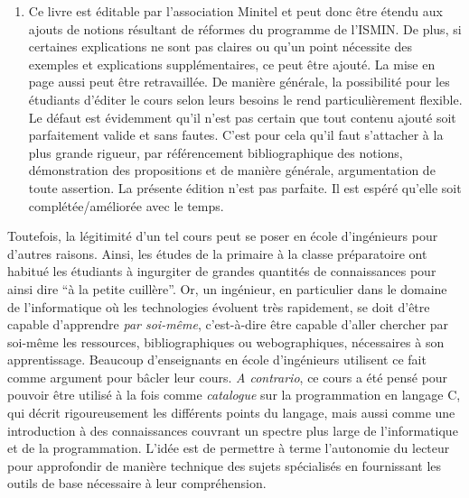 \documentclass[../main.tex]{subfiles}
\begin{document}
\begin{enumerate}
	\item Ce livre est éditable par l'association Minitel et peut donc être étendu aux ajouts de notions résultant de réformes du programme de l'ISMIN. De plus, si certaines explications ne sont pas claires ou qu'un point nécessite des exemples et explications supplémentaires, ce peut être ajouté. La mise en page aussi peut être retravaillée. De manière générale, la possibilité pour les étudiants d'éditer le cours selon leurs besoins le rend particulièrement flexible. Le défaut est évidemment qu'il n'est pas certain que tout contenu ajouté soit parfaitement valide et sans fautes. C'est pour cela qu'il faut s'attacher à la plus grande rigueur, par référencement bibliographique des notions, démonstration des propositions et de manière générale, argumentation de toute assertion. La présente édition n'est pas parfaite. Il est espéré qu'elle soit complétée/améliorée avec le temps.
\end{enumerate}
Toutefois, la légitimité d'un tel cours peut se poser en école d'ingénieurs pour d'autres raisons. Ainsi, les études de la primaire à la classe préparatoire ont habitué les étudiants à ingurgiter de grandes quantités de connaissances pour ainsi dire ``à la petite cuillère''. Or, un ingénieur, en particulier dans le domaine de l'informatique où les technologies évoluent très rapidement, se doit d'être capable d'apprendre \textit{par soi-même}, c'est-à-dire être capable d'aller chercher par soi-même les ressources, bibliographiques ou webographiques, nécessaires à son apprentissage. Beaucoup d'enseignants en école d'ingénieurs utilisent ce fait comme argument pour bâcler leur cours. \textit{A contrario}, ce cours a été pensé pour pouvoir être utilisé à la fois comme \textit{catalogue} sur la programmation en langage C, qui décrit rigoureusement les différents points du langage, mais aussi comme une introduction à des connaissances couvrant un spectre plus large de l'informatique et de la programmation. L'idée est de permettre à terme l'autonomie du lecteur pour approfondir de manière technique des sujets spécialisés en fournissant les outils de base nécessaire à leur compréhension.
\end{document}
